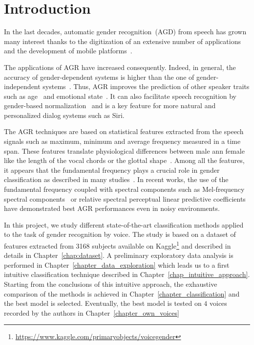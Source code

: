 

\chapter{Introduction}
\label{chap:introduction}

In the last decades, automatic gender recognition~(AGD) from speech has grown many interest thanks to the digitization of an extensive number of applications and the development of mobile platforms~\cite{Wu_JASA_1991, Wu_JASA_1991_2, Childers_ICASSP_1988, Harb2005, Zeng2006, Sorokin2008, Metze_ICASSP_2007, Bocklet_ICASSP_2008}.

The applications of AGR have increased consequently. Indeed, in general, the accuracy of gender-dependent systems is higher than the one of gender-independent systems~\cite{Harb2005}. Thus, AGR improves the prediction of other speaker traits such as age~\cite{Levi2015} and emotional state~\cite{Bisio2013, Ververidis2004}. It can also facilitate speech recognition by gender-based normalization~\cite{Wegmann_ICASSP_1996} and is a key feature for more natural and personalized dialog systems such as Siri.

The AGR techniques are based on statistical features extracted from the speech signals such as maximum, minimum and average frequency measured in a time span. These features translate physiological differences between male ann female like the length of the vocal chords or the glottal shape~\cite{Titze_JASA_1989}. Among all the features, it appears that the fundamental frequency plays a crucial role in gender classification as described in many studies~\cite{Hollien1967, Wu_JASA_1991, Poon2015}. In recent works, the use of the fundamental frequency coupled with spectral components such as Mel-frequency spectral components~\cite{Gupta2016} or relative spectral perceptual linear predictive coefficients~\cite{Zeng2006} have demonstrated best AGR performances even in noisy environments.

In this project, we study different state-of-the-art classification methods applied to the task of gender recognition by voice. The study is based on a dataset of features extracted from \num{3168} subjects available on Kaggle\footnote{\url{https://www.kaggle.com/primaryobjects/voicegender}} and described in details in Chapter~\ref{chap:dataset}. A preliminary exploratory data analysis is performed in Chapter~\ref{chapter_data_exploration} which leads us to a first intuitive classification technique described in Chapter~\ref{chap_intuitive_approach}. Starting from the conclusions of this intuitive approach, the exhaustive comparison of the methods is achieved in Chapter~\ref{chapter_classification} and the best model is selected. Eventually, the best model is tested on $\num{4}$ voices recorded by the authors in Chapter~\ref{chapter_own_voices}
  